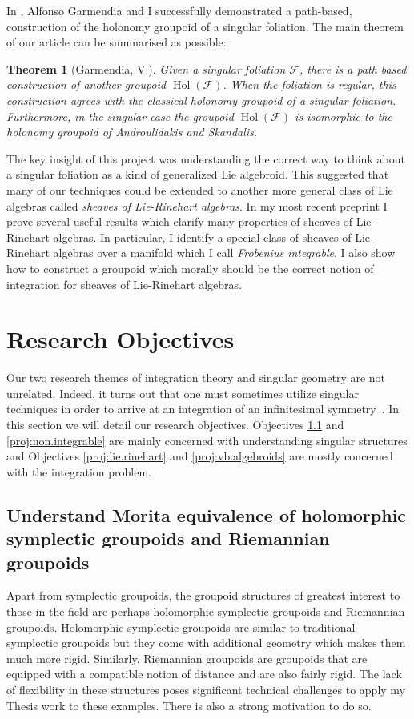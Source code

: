 \documentclass[11pt, letterpaper]{article}
\newcommand{\F}{\mathcal{F}}
\DeclareMathOperator{\Hol}{Hol}
\newtheorem{theorem}{Theorem}
\begin{document}
In \cite{villatoro2019integration}, Alfonso Garmendia and I successfully demonstrated a path-based, construction of the holonomy groupoid of a singular foliation. The main theorem of our article can be summarised as possible:

\begin{theorem}[Garmendia, V.\cite{villatoro2019integration}]\label{thm:sing.fol.paths}
Given a singular foliation \( \F \), there is a path based construction of another groupoid \( \Hol(\F) \). When the foliation is regular, this construction agrees with the classical holonomy groupoid of a singular foliation. Furthermore, in the singular case the groupoid \( \Hol(\F) \) is isomorphic to the holonomy groupoid of Androulidakis and Skandalis.
\end{theorem}

The key insight of this project was understanding the correct way to think about a singular foliation as a kind of generalized Lie algebroid. This suggested that many of our techniques could be extended to another more general class of Lie algebras called \emph{sheaves of Lie-Rinehart algebras}. In my most recent preprint\cite{fresh} I prove several useful results which clarify many properties of sheaves of Lie-Rinehart algebras. In particular, I identify a special class of sheaves of Lie-Rinehart algebras over a manifold which I call \emph{Frobenius integrable}. I also show how to construct a groupoid which morally should be the correct notion of integration for sheaves of Lie-Rinehart algebras.

\section{Research Objectives}
Our two research themes of integration theory and singular geometry are not unrelated. Indeed, it turns out that one must sometimes utilize singular techniques in order to arrive at an integration of an infinitesimal symmetry~\cite{IntViaStacks}. In this section we will detail our research objectives. Objectives \ref{proj:holomorphic} and \ref{proj:non.integrable} are mainly concerned with understanding singular structures and Objectives \ref{proj:lie.rinehart} and \ref{proj:vb.algebroids} are mostly concerned with the integration problem. 
\subsection{Understand Morita equivalence of holomorphic symplectic groupoids and Riemannian groupoids}\label{proj:holomorphic}
Apart from symplectic groupoids, the groupoid structures of greatest interest to those in the field are perhaps holomorphic symplectic groupoids and Riemannian groupoids. Holomorphic symplectic groupoids are similar to traditional symplectic groupoids but they come with additional geometry which makes them much more rigid. Similarly, Riemannian groupoids are groupoids that are equipped with a compatible notion of distance and are also fairly rigid. The lack of flexibility in these structures poses significant technical challenges to apply my Thesis work to these examples. There is also a strong motivation to do so. 
\end{document}
